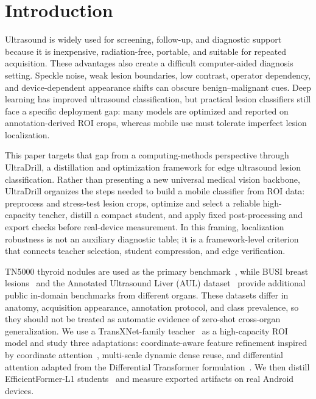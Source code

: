\documentclass[preprint,12pt]{elsarticle}
\begin{document}
\section{Introduction}
\label{sec:introduction}

Ultrasound is widely used for screening, follow-up, and diagnostic support because it is inexpensive, radiation-free, portable, and suitable for repeated acquisition. These advantages also create a difficult computer-aided diagnosis setting. Speckle noise, weak lesion boundaries, low contrast, operator dependency, and device-dependent appearance shifts can obscure benign--malignant cues. Deep learning has improved ultrasound classification, but practical lesion classifiers still face a specific deployment gap: many models are optimized and reported on annotation-derived ROI crops, whereas mobile use must tolerate imperfect lesion localization.

This paper targets that gap from a computing-methods perspective through UltraDrill, a distillation and optimization framework for edge ultrasound lesion classification. Rather than presenting a new universal medical vision backbone, UltraDrill organizes the steps needed to build a mobile classifier from ROI data: preprocess and stress-test lesion crops, optimize and select a reliable high-capacity teacher, distill a compact student, and apply fixed post-processing and export checks before real-device measurement. In this framing, localization robustness is not an auxiliary diagnostic table; it is a framework-level criterion that connects teacher selection, student compression, and edge verification.

TN5000 thyroid nodules are used as the primary benchmark~\cite{Zhang_2025}, while BUSI breast lesions~\cite{Al_Dhabyani_2020} and the Annotated Ultrasound Liver (AUL) dataset~\cite{aul_dataset} provide additional public in-domain benchmarks from different organs. These datasets differ in anatomy, acquisition appearance, annotation protocol, and class prevalence, so they should not be treated as automatic evidence of zero-shot cross-organ generalization. We use a TransXNet-family teacher~\cite{transxnet} as a high-capacity ROI model and study three adaptations: coordinate-aware feature refinement inspired by coordinate attention~\cite{hou2021coordinate}, multi-scale dynamic dense reuse, and differential attention adapted from the Differential Transformer formulation~\cite{ye2024differential}. We then distill EfficientFormer-L1 students~\cite{li2022efficientformer} and measure exported artifacts on real Android devices.
\end{document}
